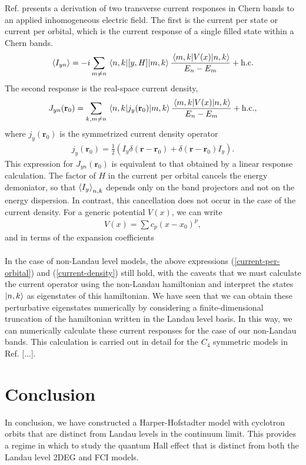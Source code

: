 \documentclass[aps,prb,twocolumn,letterpaper,twoside,nobalancelastpage,groupedaddress,amsmath,amssymb,floatfix,citeautoscript]{revtex4-1}
\begin{document}
Ref.  presents a derivation of two transverse current responses in Chern bands to an applied inhomogeneous electric field. The first is the current per state or current per orbital, which is the current response of a single filled state within a Chern bands.
\begin{align}
\label{current-per-orbital}
\expval{I_{yn}} = -i\sum_{m\neq n} \mel{n,k}{\comm{y}{H}}{m,k}\frac{\mel{m,k}{V(x)}{n,k}}{E_n-E_m} + \text{h.c.}
\end{align}
The second response is the real-space current density, 
\begin{align}
\label{current-density}
J_{yn}(\mathbf{r}_0) = \sum_{k,m\neq n} \mel{n,k}{j_y(\mathbf{r}_0)}{m,k} \frac{\mel{m,k}{V(x)}{n,k}}{E_n-E_m} + \text{h.c.},
\end{align}
where $j_y(\mathbf{r}_0)$ is the symmetrized current density operator
\begin{align*}
j_y(\mathbf{r}_0) = \frac{1}{2}\left(I_y \delta(\mathbf{r} - \mathbf{r}_0) + \delta(\mathbf{r} - \mathbf{r}_0)I_y \right).
\end{align*}
This expression for $J_{yn}(\mathbf{r}_0)$ is equivalent to that obtained by a linear response calculation. The factor of $H$ in the current per orbital cancels the energy demoniator, so that $\expval{I_y}_{n,k}$ depends only on the band projectors and not on the energy dispersion. In contrast, this cancellation does not occur in the case of the current density. For a generic potential $V(x)$, we can write
\begin{align*}
V(x) = \sum c_p (x - x_0)^p,
\end{align*}
and in terms of the expansion coefficients 
\begin{align*}
\end{align*}

In the case of non-Landau level models, the above expressions (\ref{current-per-orbital}) and (\ref{current-density}) still hold, with the caveats that we must calculate the current operator using the non-Landau hamiltonian and interpret the states $\ket{n,k}$ as eigenstates of this hamiltonian. We have seen that we can obtain these perturbative eigenstates numerically by considering a finite-dimensional truncation of the hamiltonian written in the Landau level basis. In this way, we can numerically calculate these current responses for the case of our non-Landau bands. This calculation is carried out in detail for the $C_4$ symmetric models in Ref. [...].


\section{Conclusion}
In conclusion, we have constructed a Harper-Hofstadter model with cyclotron orbits that are distinct from Landau levels in the continuum limit. This provides a regime in which to study the quantum Hall effect that is distinct from both the Landau level 2DEG and FCI models. 
\end{document}
